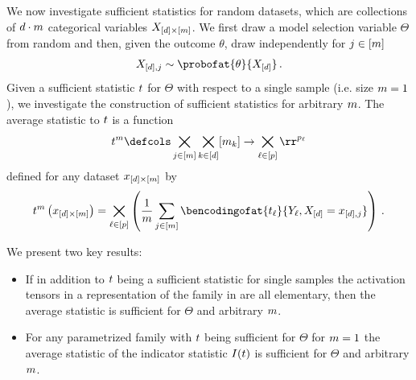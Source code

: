 \documentclass[aps,onecolumn,nofootinbib,pra]{article}
\begin{document}
    We now investigate sufficient statistics for random datasets, which are collections of $d\cdot m$ categorical variables $X_{[d]\times[m]}$.
    We first draw a model selection variable $\Theta$ from random and then, given the outcome $\theta$, draw independently for $j\in[m]$
    \begin{align*}
        \catvariableof{[\catorder],\datindex} \sim \probofat{\theta}{\shortcatvariables} \, .
    \end{align*}
    Given a sufficient statistic $t$ for $\Theta$ with respect to a single sample (i.e. size $m=1$), we investigate the construction of sufficient statistics for arbitrary $m$.
    The average statistic to $t$ is a function
    \begin{align*}
        \sstat^{\datanum} \defcols \bigtimes_{\datindexin}\bigtimes_{\catenumeratorin} [\catdimof{\catenumerator}] \rightarrow
        \bigtimes_{\selindexin} \rr^{\seldimof{\selindex}}
    \end{align*}
    defined for any dataset $x_{[d]\times[m]}$ by
    \begin{align*}
        \sstat^{\datanum}\left(\catindexof{[\catorder]\times[\datanum]}\right) =
        \bigtimes_{\selindexin} \left(\frac{1}{\datanum}\sum_{\datindexin} \bencodingofat{\sstatcoordinateof{\selindex}}{\headvariableof{\selindex},\shortcatvariables=\catindexof{[\catorder],\datindex}}\right) \, .
    \end{align*}


    We present two key results:
    \begin{itemize}
        \item If in addition to $t$ being a sufficient statistic for single samples the activation tensors in a representation of the family in \ComputationActivationNetworks{} are all elementary, then the average statistic is sufficient for $\Theta$ and arbitrary $m$.
        \item For any parametrized family with $t$ being sufficient for $\Theta$ for $m=1$ the average statistic of the indicator statistic $I(t)$ is sufficient for $\Theta$ and arbitrary $m$.
    \end{itemize}
\end{document}
